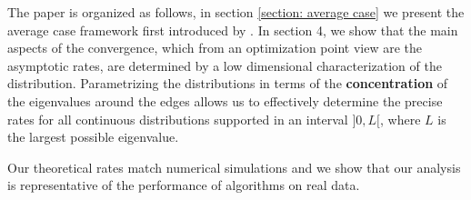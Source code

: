 \documentclass{article}
\begin{document}
The paper is organized as follows, in section \ref{section: average case} we present the average case framework first introduced by \cite{pedregosa2020acceleration}. In section 4, we  show that the main aspects of the convergence, which from an optimization point view are the asymptotic rates, are determined by a low dimensional characterization of the distribution. Parametrizing the distributions in terms of the \textbf{concentration} of the eigenvalues around the edges allows us to effectively determine the precise rates for all continuous distributions supported in an interval $]0,L[$, where $L$ is the largest possible eigenvalue. 

Our theoretical rates match numerical simulations and we show that our analysis is representative of the performance of algorithms on real data.

\end{document}
